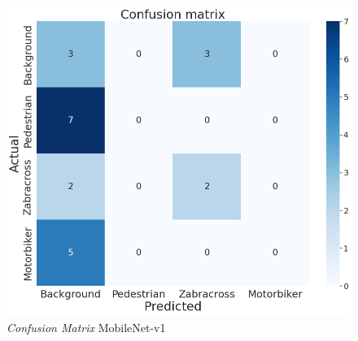 \begin{figure}[!h]
	\centering
	\includegraphics[scale=0.3]{gambar/confmatrix/all-mobilenetv1-blue.png}
	\caption{\textit{Confusion Matrix} MobileNet-v1}
	\label{fig:confmatrix-mobilenetv1}
\end{figure}